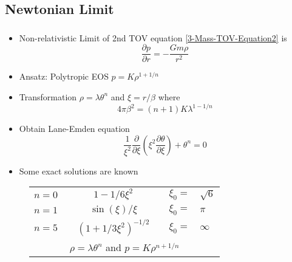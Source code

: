\subsection{Newtonian Limit}
\begin{frame}
	\frametitle{\insertsubsection}
	\begin{itemize}[<+->]
		\item Non-relativistic Limit of 2nd TOV equation \ref{3-Mass-TOV-Equation2} is
		\begin{equation}\frac{
			\partial p}{\partial r}=-\frac{Gm\rho}{r^2}
		\end{equation}
		\item Ansatz: Polytropic EOS $p=K\rho^{1+1/n}$
		\item Transformation $\rho=\lambda\theta^n$ and $\xi=r/\beta$ where
		\begin{equation}
			4\pi\beta^2=(n+1)K\lambda^{1-1/n}
		\end{equation}
		\item Obtain Lane-Emden equation \cite{laneTheoreticalTemperatureSun1870} \cite{emdenGaskugeln1907}
		\begin{equation}
			\frac{1}{\xi^2}\frac{\partial}{\partial\xi}\left(\xi^2\frac{\partial\theta}{\partial\xi}\right)+\theta^n=0
		\end{equation}
		\item Some exact solutions are known \cite{chandrasekharChandrasekharAnIntroductionStudy1958}
	\end{itemize}
\end{frame}

\begin{frame}
	\begin{figure}
		\centering
		\begin{tabular}[b]{@{}lcccrl@{}}
			\toprule
			$n=0$ && $\displaystyle 1-1/6\xi^2$ && $\xi_0=$&$\sqrt{6}$\\[1ex]
			$n=1$ && $\displaystyle \sin(\xi)/\xi$ && $\xi_0=$&$\pi$\\[1ex]
			$n=5$ && $\displaystyle \left(1+1/3\xi^2\right)^{-1/2}$ && $\xi_0=$&$\infty$\\[1ex]
			\multicolumn{6}{c}{$\rho=\lambda\theta^n$ and $p=K\rho^{n+1/n}$}\\[1ex]
			\bottomrule
		\end{tabular}
	\end{figure}
\end{frame}

